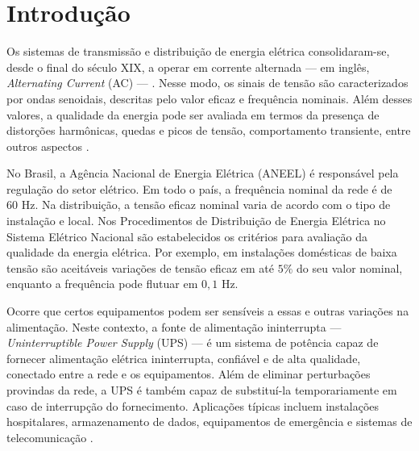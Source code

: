 \documentclass[repeatfields,oneside,overleaf]{tcc}
\begin{document}
\setcounter{tocdepth}{3}
\tableofcontents


\chapter{Introdução}\label{sec:introducao}

Os sistemas de transmissão e distribuição de energia elétrica consolidaram-se, desde o final do século XIX, a operar em corrente alternada --- em inglês, \textit{Alternating Current} (AC) --- \cite{Sadiku2013}.
Nesse modo, os sinais de tensão são caracterizados por ondas senoidais, descritas pelo valor eficaz e frequência nominais.
Além desses valores, a qualidade da energia pode ser avaliada em termos da presença de distorções harmônicas, quedas e picos de tensão, comportamento transiente, entre outros aspectos \cite{Rashid2011}.

No Brasil, a Agência Nacional de Energia Elétrica (ANEEL) é responsável pela regulação do setor elétrico.
Em todo o país, a frequência nominal da rede é de $60 \text{ Hz}$.
Na distribuição, a tensão eficaz nominal varia de acordo com o tipo de instalação e local.
Nos Procedimentos de Distribuição de Energia Elétrica no Sistema Elétrico Nacional \cite{PRODIST} são estabelecidos os critérios para avaliação da qualidade da energia elétrica.
Por exemplo, em instalações domésticas de baixa tensão são aceitáveis variações de tensão eficaz em até $5\%$ do seu valor nominal, enquanto a frequência pode flutuar em $0,1 \text{ Hz}$.

Ocorre que certos equipamentos podem ser sensíveis a essas e outras variações na alimentação.
Neste contexto, a fonte de alimentação ininterrupta --- \textit{Uninterruptible Power Supply} (UPS) --- é um sistema de potência capaz de fornecer alimentação elétrica ininterrupta, confiável e de alta qualidade, conectado entre a rede e os equipamentos.
Além de eliminar perturbações provindas da rede, a UPS é também capaz de substituí-la temporariamente em caso de interrupção do fornecimento.
Aplicações típicas incluem instalações hospitalares, armazenamento de dados, equipamentos de emergência e sistemas de telecomunicação \cite{Rashid2011}.
\end{document}
